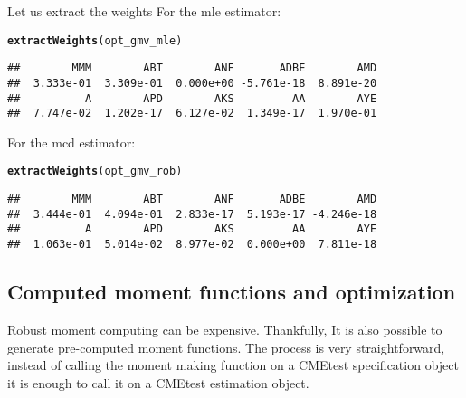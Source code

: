 \documentclass[12pt,letterpaper,english]{article}\usepackage[]{graphicx}\usepackage[]{color}
\makeatletter
\newcommand{\hlstd}[1]{\textcolor[rgb]{0.345,0.345,0.345}{#1}}%
\newcommand{\hlkwd}[1]{\textcolor[rgb]{0.737,0.353,0.396}{\textbf{#1}}}%
\newenvironment{kframe}{%
 \def\at@end@of@kframe{}%
 \ifinner\ifhmode%
  \def\at@end@of@kframe{\end{minipage}}%
  \begin{minipage}{\columnwidth}%
 \fi\fi%
 \def\FrameCommand##1{\hskip\@totalleftmargin \hskip-\fboxsep
 \colorbox{shadecolor}{##1}\hskip-\fboxsep
     \hskip-\linewidth \hskip-\@totalleftmargin \hskip\columnwidth}%
 \MakeFramed {\advance\hsize-\width
   \@totalleftmargin\z@ \linewidth\hsize
   \@setminipage}}%
 {\par\unskip\endMakeFramed%
 \at@end@of@kframe}
\newenvironment{knitrout}{}{} %
\makeatother
\begin{document}
Let us extract the weights
For the mle estimator:
\begin{knitrout}
\color{fgcolor}\begin{kframe}
\begin{alltt}
\hlkwd{extractWeights}\hlstd{(opt_gmv_mle)}
\end{alltt}
\begin{verbatim}
##        MMM        ABT        ANF       ADBE        AMD 
##  3.333e-01  3.309e-01  0.000e+00 -5.761e-18  8.891e-20 
##          A        APD        AKS         AA        AYE 
##  7.747e-02  1.202e-17  6.127e-02  1.349e-17  1.970e-01
\end{verbatim}
\end{kframe}
\end{knitrout}

For the mcd estimator:
\begin{knitrout}
\color{fgcolor}\begin{kframe}
\begin{alltt}
\hlkwd{extractWeights}\hlstd{(opt_gmv_rob)}
\end{alltt}
\begin{verbatim}
##        MMM        ABT        ANF       ADBE        AMD 
##  3.444e-01  4.094e-01  2.833e-17  5.193e-17 -4.246e-18 
##          A        APD        AKS         AA        AYE 
##  1.063e-01  5.014e-02  8.977e-02  0.000e+00  7.811e-18
\end{verbatim}
\end{kframe}
\end{knitrout}

\subsection{Computed moment functions and optimization}
Robust moment computing can be expensive. Thankfully, It is also possible to generate pre-computed moment functions. The process is very straightforward, instead of calling the moment making function on a CMEtest specification object it is enough to call it on a CMEtest estimation object.
\end{document}
